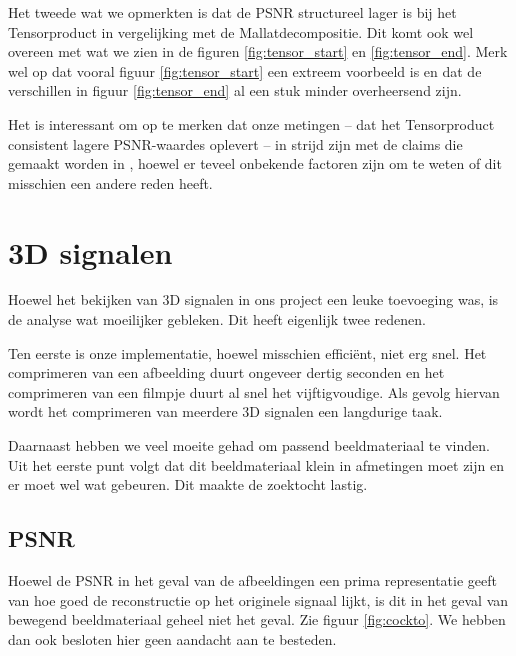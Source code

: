 Het tweede wat we opmerkten is dat de PSNR structureel lager is bij het Tensorproduct in vergelijking met de Mallatdecompositie. Dit komt ook wel overeen met wat we zien in de figuren \ref{fig:tensor_start} en \ref{fig:tensor_end}. Merk wel op dat vooral figuur \ref{fig:tensor_start} een extreem voorbeeld is en dat de verschillen in figuur \ref{fig:tensor_end} al een stuk minder overheersend zijn.

Het is interessant om op te merken dat onze metingen -- dat het Tensorproduct consistent lagere PSNR-waardes oplevert -- in strijd zijn met de claims die gemaakt worden in \cite{tensor_vs_mallat}, hoewel er teveel onbekende factoren zijn om te weten of dit misschien een andere reden heeft.
\section{3D signalen}
Hoewel het bekijken van 3D signalen in ons project een leuke toevoeging was, is de analyse wat moeilijker gebleken. Dit heeft eigenlijk twee redenen.

Ten eerste is onze implementatie, hoewel misschien effici\"ent, niet erg snel. Het comprimeren van een afbeelding duurt ongeveer dertig seconden en het comprimeren van een filmpje duurt al snel het vijftigvoudige. Als gevolg hiervan wordt het comprimeren van meerdere 3D signalen een langdurige taak.

Daarnaast hebben we veel moeite gehad om passend beeldmateriaal te vinden. Uit het eerste punt volgt dat dit beeldmateriaal klein in afmetingen moet zijn en er moet wel wat gebeuren. Dit maakte de zoektocht lastig.

\subsection{PSNR}
Hoewel de PSNR in het geval van de afbeeldingen een prima representatie geeft van hoe goed de reconstructie op het originele signaal lijkt, is dit in het geval van bewegend beeldmateriaal geheel niet het geval. Zie figuur \ref{fig:cockto}. We hebben dan ook besloten hier geen aandacht aan te besteden.

